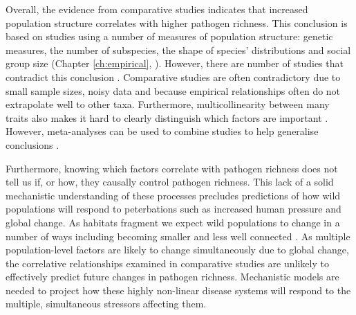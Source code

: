Overall, the evidence from comparative studies indicates that increased population structure correlates with higher pathogen richness.
This conclusion is based on studies using a number of measures of population structure: genetic measures, the number of subspecies, the shape of species' distributions and social group size (Chapter \ref{ch:empirical}, \cites{vitone2004body, maganga2014bat, turmelle2009correlates}).
However, there are number of studies that contradict this conclusion \cite{gay2014parasite, bordes2007rodent, ezenwa2006host}.
Comparative studies are often contradictory due to small sample sizes, noisy data and because empirical relationships often do not extrapolate well to other taxa. 
Furthermore, multicollinearity between many traits also makes it hard to clearly distinguish which factors are important \cite{nunn2015infectious}.
However, meta-analyses can be used to combine studies to help generalise conclusions \cite{kamiya2014determines}.



Furthermore, knowing which factors correlate with pathogen richness does not tell us if, or how, they causally control pathogen richness.
This lack of a solid mechanistic understanding of these processes precludes predictions of how wild populations will respond to peterbations such as increased human pressure and global change.
As habitats fragment we expect wild populations to change in a number of ways including becoming smaller and less well connected \cite{andren1994effects, cushman2012separating}.
As multiple population-level factors are likely to change simultaneously due to global change, the correlative relationships examined in comparative studies are unlikely to effectively predict future changes in pathogen richness.
Mechanistic models are needed to project how these highly non-linear disease systems will respond to the multiple, simultaneous stressors affecting them.




